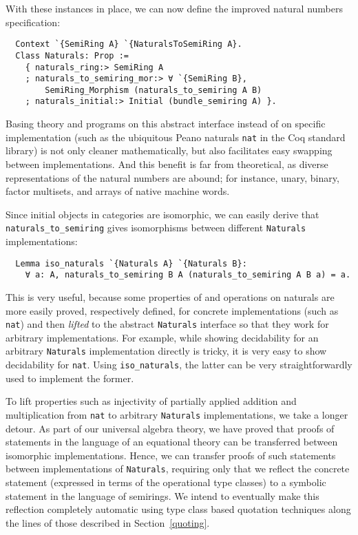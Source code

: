 \documentclass[a4paper,10pt,runningheads]{llncs}
\begin{document}
With these instances in place, we can now define the improved natural numbers specification:
\begin{lstlisting}
  Context `{SemiRing A} `{NaturalsToSemiRing A}.
  Class Naturals: Prop :=
    { naturals_ring:> SemiRing A
    ; naturals_to_semiring_mor:> ∀ `{SemiRing B},
        SemiRing_Morphism (naturals_to_semiring A B)
    ; naturals_initial:> Initial (bundle_semiring A) }.
\end{lstlisting}
Basing theory and programs on this abstract interface instead of on specific implementation (such as the ubiquitous Peano naturals \lstinline|nat| in the Coq standard library) is not only cleaner mathematically, but also facilitates easy swapping between implementations. And this benefit is far from theoretical, as diverse representations of the natural numbers are abound; for instance, unary, binary, factor multisets, and arrays of native machine words.

Since initial objects in categories are isomorphic, we can easily derive that \lstinline|naturals_to_semiring| gives isomorphisms between different \lstinline|Naturals| implementations:
\begin{lstlisting}
  Lemma iso_naturals `{Naturals A} `{Naturals B}:
    ∀ a: A, naturals_to_semiring B A (naturals_to_semiring A B a) = a.
\end{lstlisting}
This is very useful, because some properties of and operations on naturals are more easily proved, respectively defined, for concrete implementations (such as \lstinline|nat|) and then \emph{lifted} to the abstract \lstinline|Naturals| interface so that they work for arbitrary implementations. For example, while showing decidability for an arbitrary \lstinline|Naturals| implementation directly is tricky, it is very easy to show decidability for \lstinline|nat|. Using \lstinline|iso_naturals|, the latter can be very straightforwardly used to implement the former.

To lift properties such as injectivity of partially applied addition and multiplication from \lstinline|nat| to arbitrary \lstinline|Naturals| implementations, we take a longer detour. As part of our universal algebra theory, we have proved that proofs of statements in the language of an equational theory can be transferred between isomorphic implementations. Hence, we can transfer proofs of such statements between implementations of \lstinline|Naturals|, requiring only that we reflect the concrete statement (expressed in terms of the operational type classes) to a symbolic statement in the language of semirings. We intend to eventually make this reflection completely automatic using type class based quotation techniques along the lines of those described in Section~\ref{quoting}.
\end{document}
